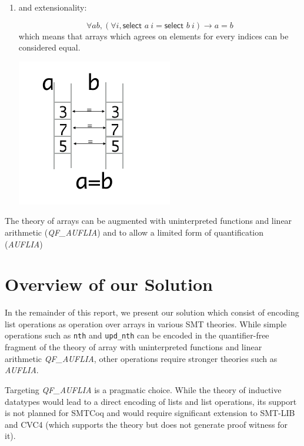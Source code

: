 \documentclass[onecolumn, preprint]{sigplanconf}
\begin{document}
\begin{enumerate}
\item and extensionality:
  
  \begin{multicols}{2}
  $$ \forall a b, (\forall i, \textsf{select } a\ i = \textsf{select } b\ i) \to a = b$$
  which means that arrays which agrees on elements for every indices can be considered equal.

  \includegraphics[scale=0.5]{pictures/axiom3.png}
  \end{multicols}
  \end{enumerate}
  

The theory of arrays can be augmented with uninterpreted functions and linear arithmetic (\emph{QF\_AUFLIA}) and to allow a limited form of quantification (\emph{AUFLIA})



\section{Overview of our Solution}
\label{sec:solution}

In the remainder of this report, we present our solution which consist of encoding list operations as operation over arrays in various SMT theories. While simple operations such as \lstinline|nth| and \lstinline|upd_nth| can be encoded in the quantifier-free fragment of the theory of array with uninterpreted functions and linear arithmetic \emph{QF\_AUFLIA}, other operations require stronger theories such as \emph{AUFLIA}. 

Targeting \emph{QF\_AUFLIA} is a pragmatic choice. While the theory of inductive datatypes would lead to a direct encoding of lists and list operations, its support is not planned for SMTCoq and would require significant extension to SMT-LIB and CVC4 (which supports the theory but does not generate proof witness for it). 

\end{document}
